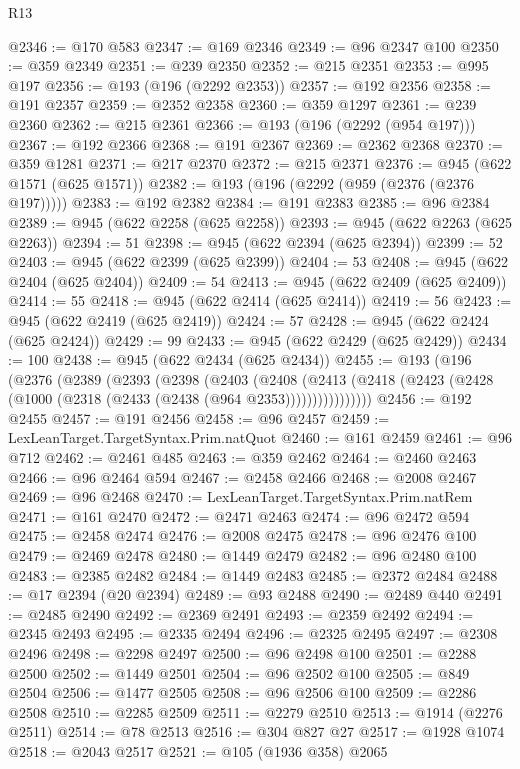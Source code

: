 \begin{lexlean}{R13}
\begin{coremodule}
@2346 := @170 @583
@2347 := @169 @2346
@2349 := @96 @2347 @100
@2350 := @359 @2349
@2351 := @239 @2350
@2352 := @215 @2351
@2353 := @995 @197
@2356 := @193 (@196 (@2292 @2353))
@2357 := @192 @2356
@2358 := @191 @2357
@2359 := @2352 @2358
@2360 := @359 @1297
@2361 := @239 @2360
@2362 := @215 @2361
@2366 := @193 (@196 (@2292 (@954 @197)))
@2367 := @192 @2366
@2368 := @191 @2367
@2369 := @2362 @2368
@2370 := @359 @1281
@2371 := @217 @2370
@2372 := @215 @2371
@2376 := @945 (@622 @1571 (@625 @1571))
@2382 := @193 (@196 (@2292 (@959 (@2376 (@2376 @197)))))
@2383 := @192 @2382
@2384 := @191 @2383
@2385 := @96 @2384
@2389 := @945 (@622 @2258 (@625 @2258))
@2393 := @945 (@622 @2263 (@625 @2263))
@2394 := 51
@2398 := @945 (@622 @2394 (@625 @2394))
@2399 := 52
@2403 := @945 (@622 @2399 (@625 @2399))
@2404 := 53
@2408 := @945 (@622 @2404 (@625 @2404))
@2409 := 54
@2413 := @945 (@622 @2409 (@625 @2409))
@2414 := 55
@2418 := @945 (@622 @2414 (@625 @2414))
@2419 := 56
@2423 := @945 (@622 @2419 (@625 @2419))
@2424 := 57
@2428 := @945 (@622 @2424 (@625 @2424))
@2429 := 99
@2433 := @945 (@622 @2429 (@625 @2429))
@2434 := 100
@2438 := @945 (@622 @2434 (@625 @2434))
@2455 := @193
    (@196
      (@2376
        (@2389
          (@2393
            (@2398
              (@2403
                (@2408
                  (@2413
                    (@2418 (@2423 (@2428 (@1000 (@2318 (@2433 (@2438 (@964 @2353))))))))))))))))
@2456 := @192 @2455
@2457 := @191 @2456
@2458 := @96 @2457
@2459 := LexLeanTarget.TargetSyntax.Prim.natQuot
@2460 := @161 @2459
@2461 := @96 @712
@2462 := @2461 @485
@2463 := @359 @2462
@2464 := @2460 @2463
@2466 := @96 @2464 @594
@2467 := @2458 @2466
@2468 := @2008 @2467
@2469 := @96 @2468
@2470 := LexLeanTarget.TargetSyntax.Prim.natRem
@2471 := @161 @2470
@2472 := @2471 @2463
@2474 := @96 @2472 @594
@2475 := @2458 @2474
@2476 := @2008 @2475
@2478 := @96 @2476 @100
@2479 := @2469 @2478
@2480 := @1449 @2479
@2482 := @96 @2480 @100
@2483 := @2385 @2482
@2484 := @1449 @2483
@2485 := @2372 @2484
@2488 := @17 @2394 (@20 @2394)
@2489 := @93 @2488
@2490 := @2489 @440
@2491 := @2485 @2490
@2492 := @2369 @2491
@2493 := @2359 @2492
@2494 := @2345 @2493
@2495 := @2335 @2494
@2496 := @2325 @2495
@2497 := @2308 @2496
@2498 := @2298 @2497
@2500 := @96 @2498 @100
@2501 := @2288 @2500
@2502 := @1449 @2501
@2504 := @96 @2502 @100
@2505 := @849 @2504
@2506 := @1477 @2505
@2508 := @96 @2506 @100
@2509 := @2286 @2508
@2510 := @2285 @2509
@2511 := @2279 @2510
@2513 := @1914 (@2276 @2511)
@2514 := @78 @2513
@2516 := @304 @827 @27
@2517 := @1928 @1074
@2518 := @2043 @2517
@2521 := @105 (@1936 @358) @2065

\end{coremodule}
\end{lexlean}
